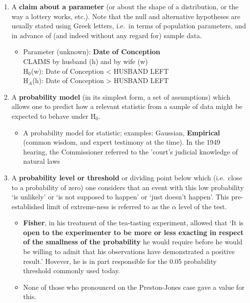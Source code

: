 \documentclass[]{book}
\providecommand{\tightlist}{%
  \setlength{\itemsep}{0pt}\setlength{\parskip}{0pt}}
\begin{document}
\begin{enumerate}
\def\labelenumi{\arabic{enumi}.}
\item
  A \textbf{claim about a parameter} (or about the shape of a distribution,
  or the way a lottery works, etc.). Note that the null and alternative hypotheses are usually stated using Greek letters, i.e.~in terms of population parameters, and in advance of (and indeed without any regard for) sample data.

  \begin{itemize}
  \tightlist
  \item
    Parameter (unknown): \textbf{Date of Conception}\\
    CLAIMS by husband (h) and by wife (w)\\
    H\(_0\)(w): Date of Conception \textless{} HUSBAND LEFT\\
    H\(_A\)(h): Date of Conception \textgreater{} HUSBAND LEFT
  \end{itemize}
\item
  A \textbf{probability model} (in its simplest form, a set of assumptions) which allows one to predict how a relevant statistic from a sample
  of data might be expected to behave under H\(_0\).

  \begin{itemize}
  \tightlist
  \item
    A probability model for statistic; examples: Gaussian, \textbf{Empirical} (common wisdom, and expert testimony at the time). In the 1949 hearing, the Commissioner referred to the 'court's judicial knowledge of natural laws
  \end{itemize}
\item
  A \textbf{probability level or threshold} or dividing point below which (i.e.~close to a probability of zero) one considers that an event with this low probability `is unlikely' or `is not supposed to
  happen' or `just doesn't happen'. This pre-established limit of extreme-ness is referred to as the \(\alpha\) level of the test.

  \begin{itemize}
  \item
    \textbf{Fisher}, in his treatment of the tea-tasting experiment, allowed that `It is \textbf{open to the experimenter to be more or less exacting in respect of the smallness of the probability} he would require before he would be willing to admit that his observations have demonstrated a positive result.' Hovever, he is in part responsible for the 0.05 probability threshold commonly used today.
  \item
    None of those who pronounced on the Preston-Jones case gave a value for this.
  \end{itemize}


\end{enumerate}
\end{document}
